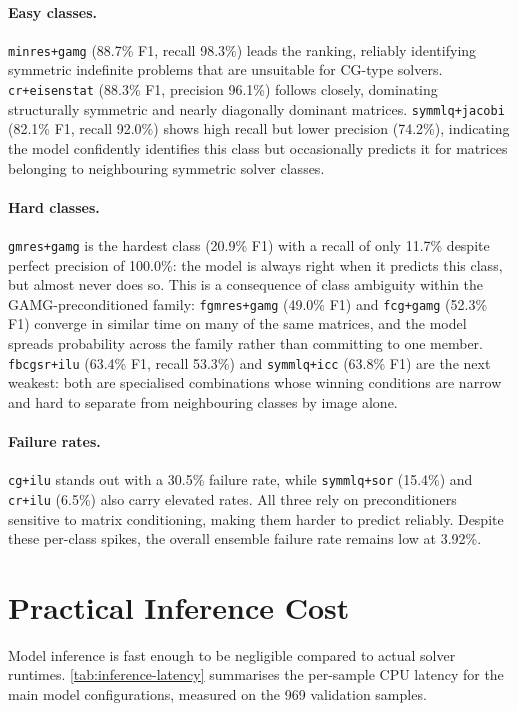 \paragraph{Easy classes.}
\texttt{minres+gamg} (88.7\% F1, recall 98.3\%) leads the ranking, reliably identifying
symmetric indefinite problems that are unsuitable for CG-type solvers.
\texttt{cr+eisenstat} (88.3\% F1, precision 96.1\%) follows closely, dominating structurally
symmetric and nearly diagonally dominant matrices.
\texttt{symmlq+jacobi} (82.1\% F1, recall 92.0\%) shows high recall but lower precision
(74.2\%), indicating the model confidently identifies this class but occasionally predicts
it for matrices belonging to neighbouring symmetric solver classes.

\paragraph{Hard classes.}
\texttt{gmres+gamg} is the hardest class (20.9\% F1) with a recall of only 11.7\%
despite perfect precision of 100.0\%: the model is always right when it predicts this class,
but almost never does so.
This is a consequence of class ambiguity within the GAMG-preconditioned family:
\texttt{fgmres+gamg} (49.0\% F1) and \texttt{fcg+gamg} (52.3\% F1) converge in similar
time on many of the same matrices, and the model spreads probability across the family
rather than committing to one member.
\texttt{fbcgsr+ilu} (63.4\% F1, recall 53.3\%) and \texttt{symmlq+icc} (63.8\% F1) are
the next weakest: both are specialised combinations whose winning conditions are narrow
and hard to separate from neighbouring classes by image alone.

\paragraph{Failure rates.}
\texttt{cg+ilu} stands out with a 30.5\% failure rate, while \texttt{symmlq+sor} (15.4\%) and \texttt{cr+ilu} (6.5\%) also carry elevated rates.
All three rely on preconditioners sensitive to matrix conditioning, making them harder to predict reliably.
Despite these per-class spikes, the overall ensemble failure rate remains low at 3.92\%.

\section{Practical Inference Cost}\label{sec:inference-cost}

Model inference is fast enough to be negligible compared to actual solver runtimes.
\autoref{tab:inference-latency} summarises the per-sample CPU latency for the main model configurations, measured on the
969 validation samples.

